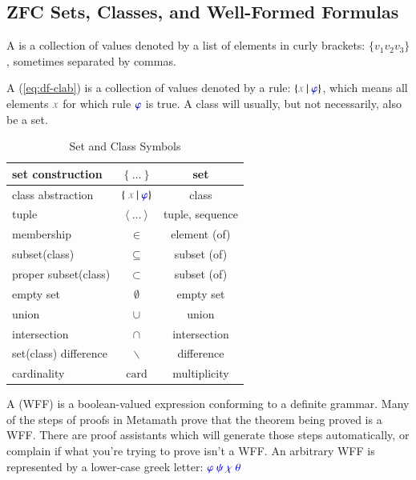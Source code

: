 \subsection{ZFC Sets, Classes, and Well-Formed Formulas} 

\pn A  is a collection of values denoted by a list of elements in curly brackets:  $\{ v_1 v_2 v_3 \}$, sometimes separated by commas.

\pn A  (\ref{eq:df-clab}) is a collection of values denoted by a rule: $\{ \mm{x}~\vert~\mw{\varphi} \}$, which means all elements $\mm{x}$ for which rule $\mw{\varphi}$ is true.
A class will usually, but not necessarily, also be a set.
\begin{table}[h]
\caption{Set and Class Symbols}
\begin{center}
\begin{tabular}{|l|c|c|}
\hline
set construction & $\{~\dots~\}$ & set \\ \hline
class abstraction & $\{~\mm{x}~\vert~\mw{\varphi}\}$ & class \\ \hline
tuple & $\langle~\ldots~\rangle$ & tuple, sequence \\ \hline
membership & $\in$ & element (of) \\ \hline
subset(class) & $\subseteq$ & subset (of) \\ \hline
proper subset(class) & $\subset$ & subset (of) \\ \hline
empty set & $\emptyset$ & empty set \\ \hline
union & $\cup$ & union \\ \hline
intersection & $\cap$ & intersection \\ \hline
set(class) difference & $\backslash$ & difference \\ \hline
cardinality & $\mathrm{card}$ & multiplicity \\ \hline
\end{tabular}
\end{center}
\label{table:setsymbols}
\end{table}%

\pn A  (WFF) is a boolean-valued expression conforming to a definite grammar.  
Many of the steps of proofs in Metamath prove that the theorem being proved is a WFF.  
There are proof assistants which will generate those steps automatically, or complain if what you're trying to prove isn't a WFF.
An arbitrary WFF is represented by a lower-case greek letter: $\mw{\varphi}~\mw{\psi}~\mw{\chi}~\mw{\theta}$

